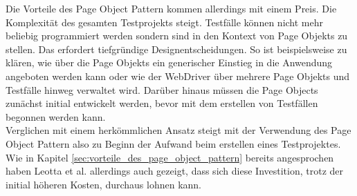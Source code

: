 Die Vorteile des Page Object Pattern kommen allerdings mit einem Preis. Die Komplexität des gesamten Testprojekts steigt. Testfälle können nicht mehr beliebig programmiert werden sondern sind in den Kontext von Page Objekts zu stellen. Das erfordert tiefgründige Designentscheidungen. So ist beispielsweise zu klären, wie über die Page Objekts ein generischer Einstieg in die Anwendung angeboten werden kann oder wie der WebDriver über mehrere Page Objekts und Testfälle hinweg verwaltet wird. Darüber hinaus müssen die Page Objects zunächst initial entwickelt werden, bevor mit dem erstellen von Testfällen begonnen werden kann.\\
Verglichen mit einem herkömmlichen Ansatz steigt mit der Verwendung des Page Object Pattern also zu Beginn der Aufwand beim erstellen eines Testprojektes.\\
Wie in Kapitel \ref{sec:vorteile_des_page_object_pattern} bereits angesprochen haben 
Leotta et al. \cite{leotta_repairing_2013} allerdings auch gezeigt, dass sich diese Investition, trotz der initial höheren Kosten, durchaus lohnen kann.
